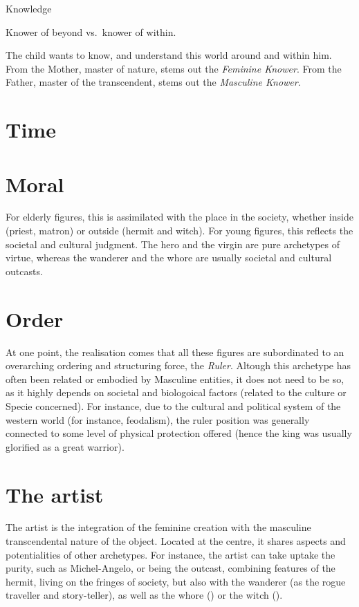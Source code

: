 \documentclass[]{book}
\begin{document}
Knowledge

Knower of beyond vs.~knower of within.

The child wants to know, and understand this world around and within him. From the Mother, master of nature, stems out the \emph{Feminine Knower}. From the Father, master of the transcendent, stems out the \emph{Masculine Knower}.

\hypertarget{time}{%
\section{Time}\label{time}}

\hypertarget{moral}{%
\section{Moral}\label{moral}}

For elderly figures, this is assimilated with the place in the society, whether inside (priest, matron) or outside (hermit and witch). For young figures, this reflects the societal and cultural judgment. The hero and the virgin are pure archetypes of virtue, whereas the wanderer and the whore are usually societal and cultural outcasts.

\hypertarget{order}{%
\section{Order}\label{order}}

At one point, the realisation comes that all these figures are subordinated to an overarching ordering and structuring force, the \emph{Ruler}. Altough this archetype has often been related or embodied by Masculine entities, it does not need to be so, as it highly depends on societal and biologoical factors (related to the culture or Specie concerned). For instance, due to the cultural and political system of the western world (for instance, feodalism), the ruler position was generally connected to some level of physical protection offered (hence the king was usually glorified as a great warrior).

\hypertarget{the-artist}{%
\section{The artist}\label{the-artist}}

The artist is the integration of the feminine creation with the masculine transcendental nature of the object. Located at the centre, it shares aspects and potentialities of other archetypes. For instance, the artist can take uptake the purity, such as Michel-Angelo, or being the outcast, combining features of the hermit, living on the fringes of society, but also with the wanderer (as the rogue traveller and story-teller), as well as the whore () or the witch ().
\end{document}
